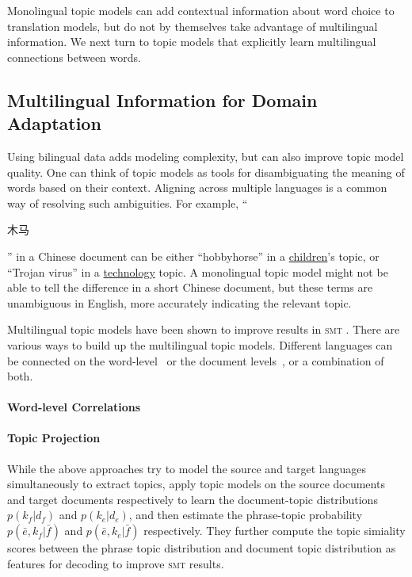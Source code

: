 Monolingual topic models can add contextual information about word choice to translation models, but do not by themselves take advantage of multilingual information.
We next turn to topic models that explicitly learn multilingual connections between words.

\subsection{Multilingual Information for Domain Adaptation}
\label{sec:trans-multiling}

Using bilingual data adds modeling complexity, but can also improve topic model quality.
One can think of topic models as tools for disambiguating the meaning of words based on their context. 
Aligning across multiple languages is a common way of resolving such ambiguities.
 For example, ``\begin{CJK*}{UTF8}{gbsn}木马\end{CJK*}'' in a Chinese
  document can be either ``hobbyhorse'' in a \underline{children}'s
  topic, or ``Trojan virus'' in a \underline{technology} topic.  
  A monolingual topic model might not be able to tell the difference in a short Chinese document, but these terms
  are unambiguous in English, more accurately indicating the relevant topic.

Multilingual topic models have been shown to improve results in \textsc{smt} \citet{Eidelman-12}.
There are various ways to build up the multilingual topic
models. Different languages can be connected on the
word-level~\citep{boyd-graber-07,andrzejewski-09,hu-14:itm} or the
document levels~\citep{mimno-09}, or a combination of both\citet{hu-14}. 

\paragraph{\bf Word-level Correlations}


\paragraph{\bf Topic Projection}

While the above approaches try to model the source and target
languages simultaneously to extract topics, \citet{xiao-12} apply
topic models on the source documents and target documents respectively
to learn the document-topic distributions $p(k_f | d_f)$ and $p(k_e |
d_e)$, and then estimate the phrase-topic probability $p(\bar{e}, k_f
| \bar{f})$ and $p(\bar{e}, k_e | \bar{f})$ respectively. They further
compute the topic simiality scores between the phrase topic
distribution and document topic distribution as features for decoding
to improve \textsc{smt} results.


